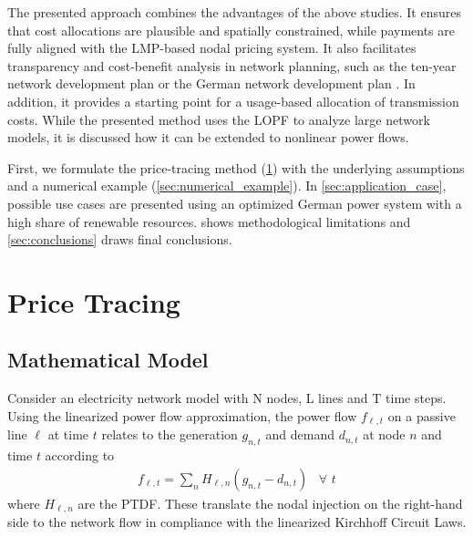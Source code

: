 \documentclass[11pt,twocolumn]{article}
\newcommand{\Forall}[1]{\hspace{10pt} \forall \,\, #1 }
\newcommand{\nodalgeneration}[1][n]{g_{#1,t}}
\newcommand{\flow}{f_{\ell,t}}
\newcommand{\demand}[1][n]{d_{#1,t}}
\newcommand{\ptdf}[1][n]{H_{\ell,#1}}
\begin{document}
The presented approach combines the advantages of the above studies. It ensures that cost allocations are plausible and spatially constrained, while payments are fully aligned with the \ac{LMP}-based nodal pricing system. It also facilitates transparency and cost-benefit analysis in network planning, such as the ten-year network development plan \cite{entso-e_completing_2020} or the German network development plan \cite{bundesnetzagentur_netzentwicklungsplan_2020}. In addition, it provides a starting point for a usage-based allocation of transmission costs. While the presented method uses the \ac{LOPF} to analyze large network models, it is discussed how it can be extended to nonlinear power flows.

First, we formulate the price-tracing method (\cref{sec:price_tracing}) with the underlying assumptions and a numerical example (\cref{sec:numerical_example}). In \cref{sec:application_case}, possible use cases are presented using an optimized German power system with a high share of renewable resources.  shows methodological limitations and \cref{sec:conclusions} draws final conclusions.



\section{Price Tracing}
\label{sec:price_tracing}

\subsection{Mathematical Model}

Consider an electricity network model with N nodes, L lines and T time steps. Using the linearized power flow approximation, the power flow $\flow$ on a passive line $\ell$ at time $t$ relates to the generation $\nodalgeneration$ and demand $\demand$ at node $n$ and time $t$ according to
\begin{align}
    \flow = \sum_n \ptdf \left(\nodalgeneration - \demand \right) \Forall{t}
\end{align}
where $\ptdf$ are the \ac{PTDF}. These translate the nodal injection on the right-hand side to the network flow in compliance with the linearized Kirchhoff Circuit Laws.
\end{document}
